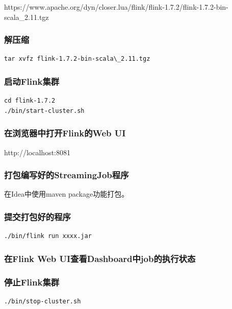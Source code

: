 \documentclass{ctexart}
\begin{document}
https://www.apache.org/dyn/closer.lua/flink/flink-1.7.2/flink-1.7.2-bin-scala\_2.11.tgz

\subsubsection{解压缩}

\begin{verbatim}
tar xvfz flink-1.7.2-bin-scala\_2.11.tgz
\end{verbatim}

\subsubsection{启动Flink集群}

\begin{verbatim}
cd flink-1.7.2
./bin/start-cluster.sh
\end{verbatim}

\subsubsection{在浏览器中打开Flink的Web UI}

http://localhost:8081

\subsubsection{打包编写好的StreamingJob程序}

在Idea中使用maven package功能打包。

\subsubsection{提交打包好的程序}

\begin{verbatim}
./bin/flink run xxxx.jar
\end{verbatim}

\subsubsection{在Flink Web UI查看Dashboard中job的执行状态}

\subsubsection{停止Flink集群}

\begin{verbatim}
./bin/stop-cluster.sh
\end{verbatim}
\end{document}
